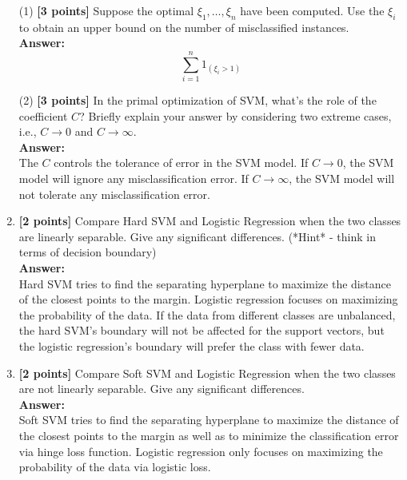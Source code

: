 \documentclass{article}
\begin{document}
\begin{enumerate}
	(1) \textbf{[3 points]} Suppose the optimal $\xi_1,\ldots,\xi_n$ have been computed. Use the $\xi_i$ to obtain an upper bound on the number of misclassified instances.\\
	\textbf{Answer:}\\
	$$\sum_{i=1}^n 1_{(\xi_i>1)}$$




	(2) \textbf{[3 points]} In the primal optimization of SVM, what's the role of the coefficient $C$?
	Briefly explain your answer by considering two extreme cases, i.e., $C\rightarrow 0$ and $C\rightarrow\infty$.\\
	\textbf{Answer:}\\
	The $C$ controls the tolerance of error in the SVM model. If $C \rightarrow 0$, the SVM model will ignore any misclassification error. If $C \rightarrow \infty$, the SVM model will not tolerate any misclassification error.



	\item\textbf{[2 points]} Compare Hard SVM and Logistic Regression when the two classes are linearly separable. Give any significant differences. (*Hint* - think in terms of decision boundary)\\
	\textbf{Answer:}\\
	Hard SVM tries to find the separating hyperplane to maximize the distance of the closest points to the margin. Logistic regression focuses on maximizing the probability of the data. If the data from different classes are unbalanced, the hard SVM's boundary will not be affected for the support vectors, but the logistic regression's boundary will prefer the class with fewer data.



	\item\textbf{[2 points]} Compare Soft SVM and Logistic Regression when the two classes are not linearly separable. Give any significant differences.\\
	\textbf{Answer:}\\
	Soft SVM tries to find the separating hyperplane to maximize the distance of the closest points to the margin as well as to minimize the classification error via hinge loss function. Logistic regression only focuses on maximizing the probability of the data via logistic loss.




\end{enumerate}
\end{document}
